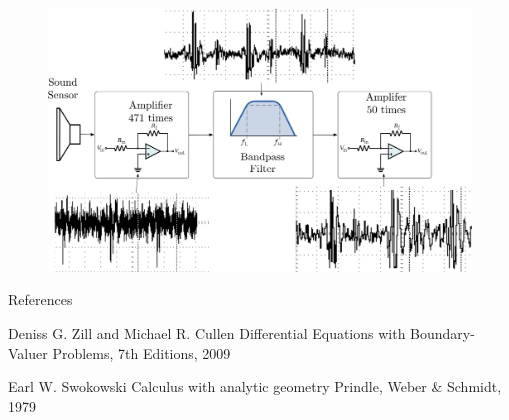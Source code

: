 \documentclass[newPxFont]{beamer}
\begin{document}
%
\begin{frame}
\begin{figure}
  \includegraphics[width=4.5in]{pcgWaves}
\end{figure}
\end{frame}


\begin{frame}{References}
	\begin{thebibliography}{10}
	\beamertemplatebookbibitems

	Deniss G. Zill and Michael R. Cullen
	\newblock Differential Equations with Boundary-Valuer Problems,
	\newblock 7th Editions, 2009


	\beamertemplatebookbibitems
	Earl W. Swokowski
	\newblock Calculus with analytic geometry
	\newblock Prindle, Weber \& Schmidt, 1979

  \end{thebibliography}
\end{frame}
\end{document}
